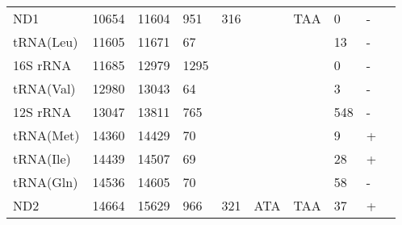 \documentclass[../DISSERTACAO_MAIN.tex]{subfiles}
\begin{document}
\begin{longtable}{llllllllllllllllllllll}
			ND1          & 10654          & \multicolumn{2}{l}{11604} & \multicolumn{2}{l}{951}        & \multicolumn{2}{l}{316}       & \multicolumn{3}{l}{}                    & \multicolumn{3}{l}{TAA}   & \multicolumn{3}{l}{0}          & \multicolumn{3}{l}{-}      & \multicolumn{2}{l}{} \\
			tRNA(Leu)    & 11605          & \multicolumn{2}{l}{11671} & \multicolumn{2}{l}{67}         & \multicolumn{2}{l}{}          & \multicolumn{3}{l}{}                    & \multicolumn{3}{l}{}      & \multicolumn{3}{l}{13}         & \multicolumn{3}{l}{-}      & \multicolumn{2}{l}{} \\
			16S 				rRNA & 11685          & \multicolumn{2}{l}{12979} & \multicolumn{2}{l}{1295}       & \multicolumn{2}{l}{}          & \multicolumn{3}{l}{}                    & \multicolumn{3}{l}{}      & \multicolumn{3}{l}{0}          & \multicolumn{3}{l}{-}      & \multicolumn{2}{l}{} \\
			tRNA(Val)    & 12980          & \multicolumn{2}{l}{13043} & \multicolumn{2}{l}{64}         & \multicolumn{2}{l}{}          & \multicolumn{3}{l}{}                    & \multicolumn{3}{l}{}      & \multicolumn{3}{l}{3}          & \multicolumn{3}{l}{-}      & \multicolumn{2}{l}{} \\
			12S 				rRNA & 13047          & \multicolumn{2}{l}{13811} & \multicolumn{2}{l}{765}        & \multicolumn{2}{l}{}          & \multicolumn{3}{l}{}                    & \multicolumn{3}{l}{}      & \multicolumn{3}{l}{548}        & \multicolumn{3}{l}{-}      & \multicolumn{2}{l}{} \\
			tRNA(Met)    & 14360          & \multicolumn{2}{l}{14429} & \multicolumn{2}{l}{70}         & \multicolumn{2}{l}{}          & \multicolumn{3}{l}{}                    & \multicolumn{3}{l}{}      & \multicolumn{3}{l}{9}          & \multicolumn{3}{l}{+}      & \multicolumn{2}{l}{} \\
			tRNA(Ile)    & 14439          & \multicolumn{2}{l}{14507} & \multicolumn{2}{l}{69}         & \multicolumn{2}{l}{}          & \multicolumn{3}{l}{}                    & \multicolumn{3}{l}{}      & \multicolumn{3}{l}{28}         & \multicolumn{3}{l}{+}      & \multicolumn{2}{l}{} \\
			tRNA(Gln)    & 14536          & \multicolumn{2}{l}{14605} & \multicolumn{2}{l}{70}         & \multicolumn{2}{l}{}          & \multicolumn{3}{l}{}                    & \multicolumn{3}{l}{}      & \multicolumn{3}{l}{58}         & \multicolumn{3}{l}{-}      & \multicolumn{2}{l}{} \\
			ND2          & 14664          & \multicolumn{2}{l}{15629} & \multicolumn{2}{l}{966}        & \multicolumn{2}{l}{321}       & \multicolumn{3}{l}{ATA}                 & \multicolumn{3}{l}{TAA}   & \multicolumn{3}{l}{37}         & \multicolumn{3}{l}{+}      & \multicolumn{2}{l}{} \\

\end{longtable}
\end{document}

